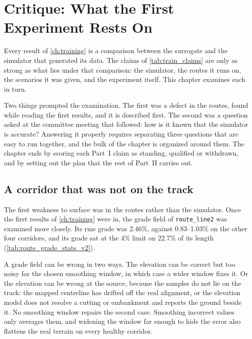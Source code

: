 \chapter{Critique: What the First Experiment Rests On}
\label{ch:critique}


Every result of \cref{ch:training} is a comparison between the surrogate and the simulator that generated its data. The claims of \cref{tab:train_claims} are only as strong as what lies under that comparison: the simulator, the routes it runs on, the scenarios it was given, and the experiment itself. This chapter examines each in turn.

Two things prompted the examination. The first was a defect in the routes, found while reading the first results, and it is described first. The second was a question asked at the committee meeting that followed: how is it known that the simulator is accurate? Answering it properly requires separating three questions that are easy to run together, and the bulk of the chapter is organized around them. The chapter ends by scoring each Part~I claim as standing, qualified or withdrawn, and by setting out the plan that the rest of Part~II carries out.

\section{A corridor that was not on the track}
\label{sec:route_raw_qa}

The first weakness to surface was in the routes rather than the simulator. Once the first results of \cref{ch:training} were in, the grade field of \texttt{route\_line2} was examined more closely. Its rms grade was 2.46\%, against 0.83--1.03\% on the other four corridors, and its grade sat at the 4\% limit on 22.7\% of its length (\cref{tab:route_grade_stats_v2}).

A grade field can be wrong in two ways. The elevation can be correct but too noisy for the chosen smoothing window, in which case a wider window fixes it. Or the elevation can be wrong at the source, because the samples do not lie on the track: the mapped centreline has drifted off the real alignment, or the elevation model does not resolve a cutting or embankment and reports the ground beside it. No smoothing window repairs the second case. Smoothing incorrect values only averages them, and widening the window far enough to hide the error also flattens the real terrain on every healthy corridor.

